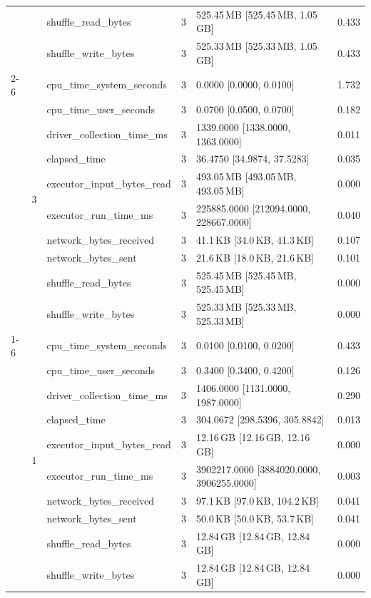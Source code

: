 \begin{tabular}{lllrll}
 &  & shuffle_read_bytes & 3 & 525.45\,MB [525.45\,MB, 1.05\,GB] & 0.433 \\
 &  & shuffle_write_bytes & 3 & 525.33\,MB [525.33\,MB, 1.05\,GB] & 0.433 \\
\cline{2-6}
 & \multirow[t]{10}{*}{3} & cpu_time_system_seconds & 3 & 0.0000 [0.0000, 0.0100] & 1.732 \\
 &  & cpu_time_user_seconds & 3 & 0.0700 [0.0500, 0.0700] & 0.182 \\
 &  & driver_collection_time_ms & 3 & 1339.0000 [1338.0000, 1363.0000] & 0.011 \\
 &  & elapsed_time & 3 & 36.4750 [34.9874, 37.5283] & 0.035 \\
 &  & executor_input_bytes_read & 3 & 493.05\,MB [493.05\,MB, 493.05\,MB] & 0.000 \\
 &  & executor_run_time_ms & 3 & 225885.0000 [212094.0000, 228667.0000] & 0.040 \\
 &  & network_bytes_received & 3 & 41.1\,KB [34.0\,KB, 41.3\,KB] & 0.107 \\
 &  & network_bytes_sent & 3 & 21.6\,KB [18.0\,KB, 21.6\,KB] & 0.101 \\
 &  & shuffle_read_bytes & 3 & 525.45\,MB [525.45\,MB, 525.45\,MB] & 0.000 \\
 &  & shuffle_write_bytes & 3 & 525.33\,MB [525.33\,MB, 525.33\,MB] & 0.000 \\
\cline{1-6} \cline{2-6}
\multirow[t]{30}{*}{national-scale-spatial-join-databricks-broadcast-4-nodes-large} & \multirow[t]{10}{*}{1} & cpu_time_system_seconds & 3 & 0.0100 [0.0100, 0.0200] & 0.433 \\
 &  & cpu_time_user_seconds & 3 & 0.3400 [0.3400, 0.4200] & 0.126 \\
 &  & driver_collection_time_ms & 3 & 1406.0000 [1131.0000, 1987.0000] & 0.290 \\
 &  & elapsed_time & 3 & 304.0672 [298.5396, 305.8842] & 0.013 \\
 &  & executor_input_bytes_read & 3 & 12.16\,GB [12.16\,GB, 12.16\,GB] & 0.000 \\
 &  & executor_run_time_ms & 3 & 3902217.0000 [3884020.0000, 3906255.0000] & 0.003 \\
 &  & network_bytes_received & 3 & 97.1\,KB [97.0\,KB, 104.2\,KB] & 0.041 \\
 &  & network_bytes_sent & 3 & 50.0\,KB [50.0\,KB, 53.7\,KB] & 0.041 \\
 &  & shuffle_read_bytes & 3 & 12.84\,GB [12.84\,GB, 12.84\,GB] & 0.000 \\
 &  & shuffle_write_bytes & 3 & 12.84\,GB [12.84\,GB, 12.84\,GB] & 0.000 \\

\end{tabular}
